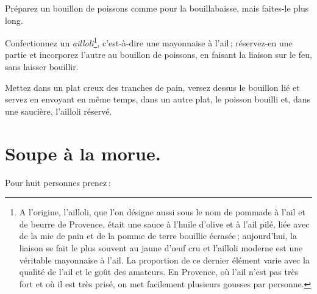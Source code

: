Préparez un bouillon de poissons comme pour la bouillabaisse, mais faites-le
plus long.

Confectionnez un \textit{ailloli}\footnote{ A l’origine, l’ailloli, que l’on
désigne aussi sous le nom de pommade à l'ail et de beurre de Provence, était
une sauce à l'huile d'olive et à l'ail pilé, liée avec de la mie de pain et de
la pomme de terre bouillie écrasée ; aujourd’hui, la liaison se fait le plus
souvent au jaune d'œuf cru et l'ailloli moderne est une véritable mayonnaise
à l'ail. La proportion de ce dernier élément varie avec la qualité de l'ail et
le goût des amateurs. En Provence, où l'ail n'est pas très fort et où il est
très prisé, on met facilement plusieurs gousses par personne.}, c'est-à-dire
une mayonnaise à l'ail ; réservez-en une partie et incorporez l'autre au
bouillon de poissons, en faisant la liaison sur le feu, sans laisser bouillir.

Mettez dans un plat creux des tranches de pain, versez dessus le bouillon lié et
servez en envoyant en même temps, dans un autre plat, le poisson bouilli et, dans
une saucière, l'ailloli réservé.

\section*{\centering Soupe à la morue.}

Pour huit personnes prenez :

\medskip

